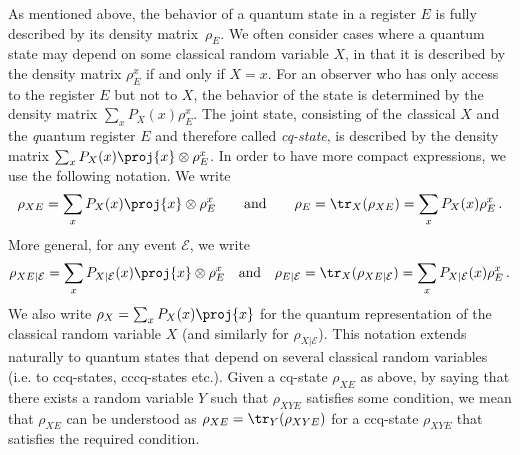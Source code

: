 \documentclass[final,11pt,a4paper]{report}
\newcommand*{\ev}{\ensuremath{\mathcal{E}}\xspace} %
\newcommand*{\regE}{E}
\begin{document}
As mentioned above, the behavior of a quantum state in a register
$\regE$ is fully described by its density matrix~$\rho_\regE$. We
often consider cases where a quantum state may depend on some
classical random variable $X$, in that it is described by the density
matrix $\rho_\regE^x$ if and only if $X = x$. For an observer who has
only access to the register $\regE$ but not to $X$, the behavior of
the state is determined by the density matrix $\sum_x P_X(x)
\rho_\regE^x$. The joint state, consisting of the \emph{c}lassical $X$ and
the \emph{q}uantum register $\regE$ and therefore called 
\emph{cq-state}, is
described by the density matrix $\sum_x P_X(x) \proj{x} \otimes
\rho_\regE^x$.  In order to have more compact expressions, we use the
following notation. We write
$$
\rho_{X\regE} = \sum_x P_X(x) \proj{x} \otimes \rho_\regE^x 
\qquad\text{and}\qquad
\rho_\regE = \tr_X(\rho_{X\regE}) = \sum_x P_X(x)\rho_\regE^x \, .
$$
More general, for any event $\ev$, we write $$
\rho_{X\regE|\ev} = \sum_x P_{X|\ev}(x) \proj{x} \otimes \rho_\regE^x
\quad\text{and}\quad
\rho_{\regE|\ev} = \tr_X(\rho_{X\regE|\ev}) = \sum_x P_{X|\ev}(x)\rho_\regE^x \, .
$$
We also write $\rho_X = \sum_x P_X(x) \proj{x}$ for the quantum
representation of the classical random variable $X$ (and similarly for
$\rho_{X|\ev}$).
This notation extends naturally to quantum states that depend on
several classical random variables (i.e. to ccq-states, cccq-states etc.).
Given a cq-state $\rho_{X \regE}$ as above, by saying that there
exists a random variable $Y$ such that $\rho_{XY\regE}$ satisfies some
condition, we mean that $\rho_{X \regE}$ can be understood as
$\rho_{X\regE} = \tr_Y(\rho_{XY\regE})$ for a ccq-state
$\rho_{XY\regE}$ that satisfies the required condition.

\end{document}
